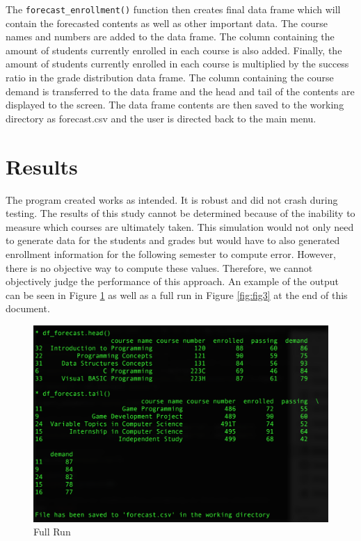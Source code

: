 \documentclass[12pt]{article}
\begin{document}
The \texttt{forecast\_enrollment()} function then creates final data frame which will contain the forecasted contents as 
well as other important data. The course names and numbers are added to the data frame. The column containing 
the amount of students currently enrolled in each course is also added. Finally, the amount of students currently enrolled
in each course is multiplied by the success ratio in the grade distribution data frame. The column containing the 
course demand is transferred to the data frame and the head and tail of the contents are displayed to the screen. The 
data frame contents are then saved to the working directory as forecast.csv and the user is directed back to the main menu.


\section*{Results}
The program created works as intended. It is robust and did not crash during testing. The results of this study 
cannot be determined because of the inability to measure which courses are ultimately taken. This simulation 
would not only need to generate data for the students and grades but would have to also generated enrollment 
information for the following semester to compute error. However, there is no objective way to compute these
values. Therefore, we cannot objectively judge the performance of this approach. 
An example of the output can be seen in Figure \ref{fig:fig2} as well as a full run in Figure \ref{fig:fig3} at the end 
of this document.
\begin{figure}[h]
    \centering
    \includegraphics[scale=0.50]{result}
    \caption{Full Run}
    \label{fig:fig2}
\end{figure}
\end{document}
